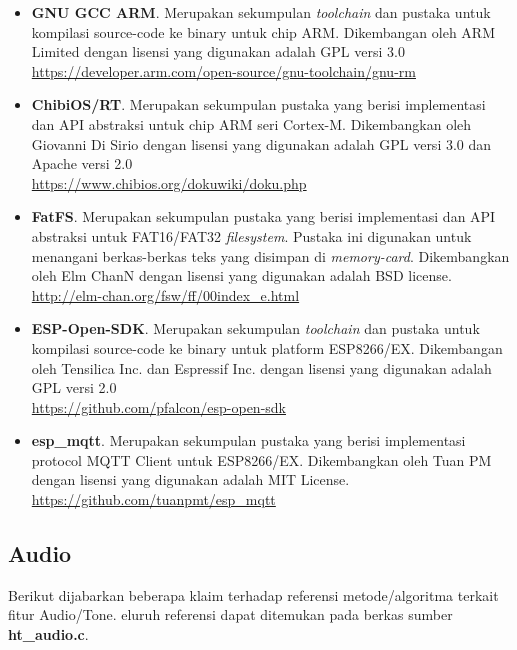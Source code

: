 \documentclass[12pt,]{article}
\begin{document}
	\begin{itemize}
		\item \textbf{GNU GCC ARM}. Merupakan sekumpulan \textit{toolchain} dan pustaka untuk kompilasi source-code ke binary untuk chip ARM.
		Dikembangan oleh ARM Limited dengan lisensi yang digunakan adalah GPL versi 3.0\\
		\url{https://developer.arm.com/open-source/gnu-toolchain/gnu-rm}
		
		\item \textbf{ChibiOS/RT}. Merupakan sekumpulan pustaka yang berisi implementasi dan API abstraksi untuk chip ARM seri Cortex-M.
		Dikembangkan oleh Giovanni Di Sirio dengan lisensi yang digunakan adalah GPL versi 3.0 dan Apache versi 2.0\\
		\url{https://www.chibios.org/dokuwiki/doku.php}
		
		\item \textbf{FatFS}. Merupakan sekumpulan pustaka yang berisi implementasi dan API abstraksi untuk FAT16/FAT32 \textit{filesystem}.
		Pustaka ini digunakan untuk menangani berkas-berkas teks yang disimpan di \textit{memory-card}.
		Dikembangkan oleh Elm ChanN dengan lisensi yang digunakan adalah BSD license.\\
		\url{http://elm-chan.org/fsw/ff/00index_e.html}
		
		\item \textbf{ESP-Open-SDK}. Merupakan sekumpulan \textit{toolchain} dan pustaka untuk kompilasi source-code ke binary untuk platform ESP8266/EX.
		Dikembangan oleh Tensilica Inc. dan Espressif Inc. dengan lisensi yang digunakan adalah GPL versi 2.0\\
		\url{https://github.com/pfalcon/esp-open-sdk}
		
		\item \textbf{esp\_mqtt}. Merupakan sekumpulan pustaka yang berisi implementasi protocol MQTT Client untuk ESP8266/EX.
		Dikembangkan oleh Tuan PM dengan lisensi yang digunakan adalah MIT License.\\
		\url{https://github.com/tuanpmt/esp_mqtt}
	\end{itemize}

	\subsection{Audio}
	
	Berikut dijabarkan beberapa klaim terhadap referensi metode/algoritma terkait fitur Audio/Tone.
	eluruh referensi dapat ditemukan pada berkas sumber \textbf{ht\_audio.c}.
	
\end{document}
